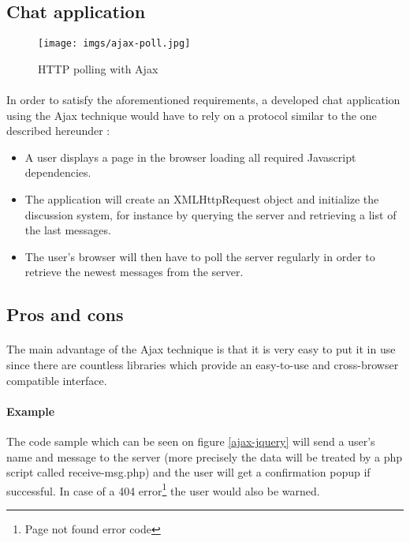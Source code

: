 \subsection{Chat application}

\begin{figure}[h]
 \begin{center}
    \texttt{[image: imgs/ajax-poll.jpg]}
 \end{center}
 \caption{HTTP polling with Ajax \cite{ibm-reverse-ajax}}
\end{figure}

\paragraph{} In order to satisfy the aforementioned requirements, a developed 
chat application using the Ajax technique would have to rely on a 
protocol similar to the one described hereunder :


\begin{itemize}
 \item A user displays a page in the browser loading all required Javascript 
dependencies.
 \item The application will create an XMLHttpRequest object and initialize the 
discussion system, for instance by querying the server and retrieving a list of 
the last messages.
 \item The user's browser will then have to poll the server regularly in order 
to retrieve the newest messages from the server.
\end{itemize}


\subsection{Pros and cons}

\paragraph{} The main advantage of the Ajax technique is that it is very easy 
to put it in use since there are countless libraries which provide an 
easy-to-use and cross-browser compatible interface.

\paragraph{Example} The code sample which can be seen on figure 
\ref{ajax-jquery} will send a user's name and message to the server (more 
precisely the data will be treated by a php script called receive-msg.php) and 
the user will get a confirmation popup if successful. In case of a 404 
error\footnote{Page not found error code} the user would also be warned.

